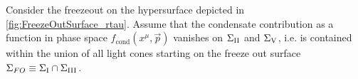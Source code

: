 
Consider the freezeout on the hypersurface depicted in \ref{fig:FreezeOutSurface_rtau}. Assume that the condensate contribution as a function in phase space $f_{\text{cond}}(x^\mu,\vec{p})$ vanishes on $\Sigma_{\text{\rom{2}}}$ and $\Sigma_{\text{\rom{5}}}$, i.e. is contained within the union of all light cones starting on the freeze out surface $\Sigma_{FO}\equiv\Sigma_{\text{\rom{1}}}\cap\Sigma_\text{{\rom{3}}}$. 


